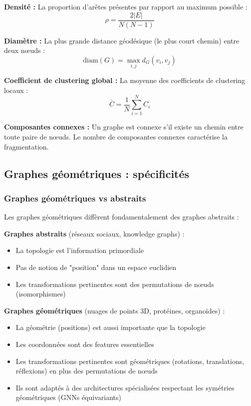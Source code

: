 \textbf{Densité :}
La proportion d'arêtes présentes par rapport au maximum possible :
\[
\rho = \frac{2|E|}{N(N-1)}
\]

\textbf{Diamètre :}
La plus grande distance géodésique (le plus court chemin) entre deux nœuds :
\[
\text{diam}(G) = \max_{i,j} d_G(v_i, v_j)
\]

\textbf{Coefficient de clustering global :}
La moyenne des coefficients de clustering locaux :
\[
\bar{C} = \frac{1}{N}\sum_{i=1}^N C_i
\]

\textbf{Composantes connexes :}
Un graphe est connexe s'il existe un chemin entre toute paire de nœuds. Le nombre de composantes connexes caractérise la fragmentation.

\subsection{Graphes géométriques : spécificités}

\subsubsection{Graphes géométriques vs abstraits}

Les graphes géométriques diffèrent fondamentalement des graphes abstraits :

\textbf{Graphes abstraits} (réseaux sociaux, knowledge graphs) :
\begin{itemize}
    \item La topologie est l'information primordiale
    \item Pas de notion de "position" dans un espace euclidien
    \item Les transformations pertinentes sont des permutations de nœuds (isomorphismes)
\end{itemize}

\textbf{Graphes géométriques} (nuages de points 3D, protéines, organoïdes) :
\begin{itemize}
    \item La géométrie (positions) est aussi importante que la topologie
    \item Les coordonnées sont des features essentielles
    \item Les transformations pertinentes sont géométriques (rotations, translations, réflexions) en plus des permutations de nœuds
    \item Ils sont adaptés à des architectures spécialisées respectant les symétries géométriques (GNNs équivariants)
\end{itemize}

